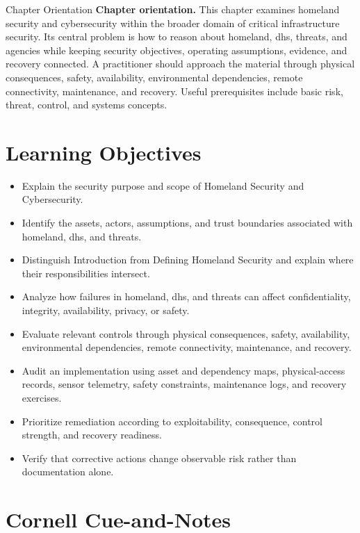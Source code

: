 \documentclass[11pt,letterpaper]{article}
\title{\CornellDocumentTitle}
\author{}
\date{}
\begin{document}
\maketitle
\begin{CornellOverviewBox}{Chapter Orientation}
\textbf{Chapter orientation.} This chapter examines homeland security and cybersecurity within the broader domain of critical infrastructure security. Its central problem is how to reason about homeland, dhs, threats, and agencies while keeping security objectives, operating assumptions, evidence, and recovery connected. A practitioner should approach the material through physical consequences, safety, availability, environmental dependencies, remote connectivity, maintenance, and recovery. Useful prerequisites include basic risk, threat, control, and systems concepts.
\end{CornellOverviewBox}
\section*{Learning Objectives}
\begin{itemize}
\item Explain the security purpose and scope of Homeland Security and Cybersecurity.
\item Identify the assets, actors, assumptions, and trust boundaries associated with homeland, dhs, and threats.
\item Distinguish Introduction from Defining Homeland Security and explain where their responsibilities intersect.
\item Analyze how failures in homeland, dhs, and threats can affect confidentiality, integrity, availability, privacy, or safety.
\item Evaluate relevant controls through physical consequences, safety, availability, environmental dependencies, remote connectivity, maintenance, and recovery.
\item Audit an implementation using asset and dependency maps, physical-access records, sensor telemetry, safety constraints, maintenance logs, and recovery exercises.
\item Prioritize remediation according to exploitability, consequence, control strength, and recovery readiness.
\item Verify that corrective actions change observable risk rather than documentation alone.
\end{itemize}
\section*{Cornell Cue-and-Notes}
\end{document}
